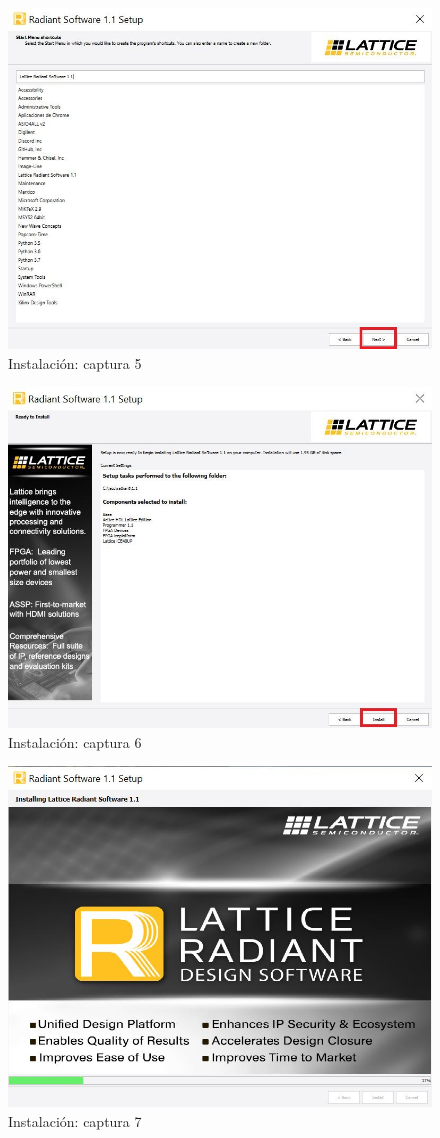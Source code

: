 \documentclass{article}
\begin{document}
\begin{figure}[H]
\centering
\includegraphics[width=0.8\linewidth]{images/inst5.JPG}
\caption{Instalación: captura 5 }
\label{fig:install}
\end{figure}

\begin{figure}[H]
\centering
\includegraphics[width=0.8\linewidth]{images/inst6.JPG}
\caption{Instalación: captura 6 }
\label{fig:install}
\end{figure}


\begin{figure}[H]
\centering
\includegraphics[width=0.8\linewidth]{images/inst7.JPG}
\caption{Instalación: captura 7 }
\label{fig:install}
\end{figure}
\end{document}
